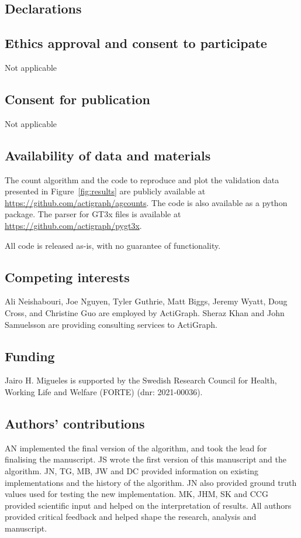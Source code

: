 \documentclass{bmcart}
\begin{document}
\begin{backmatter}
	\section*{Declarations}
	\subsection*{Ethics approval and consent to participate}
	Not applicable
	\subsection*{Consent for publication}
	Not applicable
	\subsection*{Availability of data and materials}
	The count algorithm and the code to reproduce and plot the validation
	data presented in Figure~\ref{fig:results} are publicly available at
	\url{https://github.com/actigraph/agcounts}. The code is also available as a
	python package. The parser for GT3x files is available at
	\url{https://github.com/actigraph/pygt3x}.

	All code is released as-is, with no guarantee of functionality.
	\subsection*{Competing interests}
	Ali Neishabouri, Joe Nguyen, Tyler Guthrie, Matt Biggs, Jeremy Wyatt,
	Doug Cross, and Christine Guo are employed by ActiGraph. Sheraz Khan and John
	Samuelsson are providing consulting services to ActiGraph.
	\subsection*{Funding}
	Jairo H. Migueles is supported by the Swedish Research Council for
	Health, Working Life and Welfare (FORTE) (dnr: 2021-00036).

	\subsection*{Authors' contributions}
	AN implemented the final version of the algorithm, and took the lead for finalising the manuscript. JS wrote the first version of this manuscript and the algorithm. JN, TG, MB, JW and DC provided information on existing implementations and the history of the algorithm. JN also provided ground truth values used for testing the new implementation. MK, JHM, SK and CCG provided scientific input and helped on the interpretation of results.  All authors provided critical feedback and helped shape the research, analysis and manuscript.

\end{backmatter}
\end{document}
